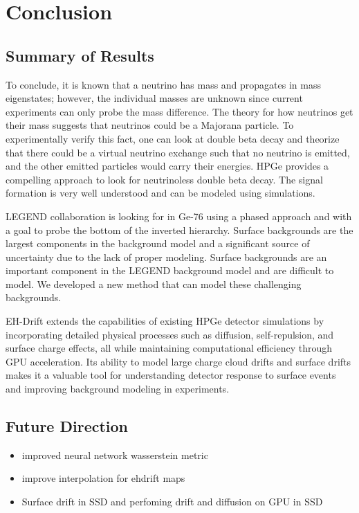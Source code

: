 \chapter{Conclusion}
\section{Summary of Results}
To conclude, it is known that a neutrino has mass and propagates in mass eigenstates; however, the individual masses are unknown since current experiments can only probe the mass difference. The theory for how neutrinos get their mass suggests that neutrinos could be a Majorana particle. To experimentally verify this fact, one can look at double beta decay and theorize that there could be a virtual neutrino exchange such that no neutrino is emitted, and the other emitted particles would carry their energies. HPGe provides a compelling approach to look for neutrinoless double beta decay. The signal formation is very well understood and can be modeled using simulations.

LEGEND collaboration is looking for {\onbb} in Ge-76 using a phased approach and with a goal to probe the bottom of the inverted hierarchy. Surface backgrounds are the largest components in the background model and a significant source of uncertainty due to the lack of proper modeling. Surface backgrounds are an important component in the LEGEND background model and are difficult to model. We developed a new method that can model these challenging backgrounds.

EH-Drift extends the capabilities of existing HPGe detector simulations by incorporating detailed physical processes such as diffusion, self-repulsion, and surface charge effects, all while maintaining computational efficiency through GPU acceleration. Its ability to model large charge cloud drifts and surface drifts makes it a valuable tool for understanding detector response to surface events and improving background modeling in experiments.


\section{Future Direction}
\begin{itemize}
    \item improved neural network wasserstein metric
    \item improve interpolation for ehdrift maps
    \item Surface drift in SSD and perfoming drift and diffusion on GPU in SSD
\end{itemize}
\label{chap:conclusion}